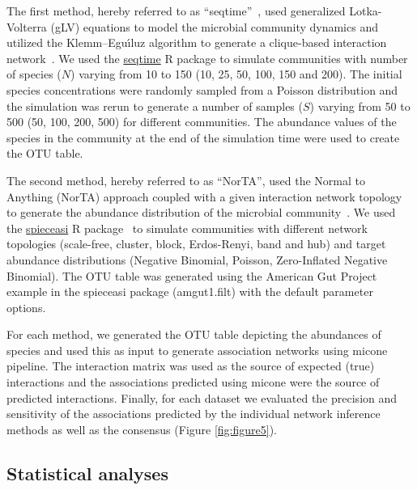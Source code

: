   The first method, hereby referred to as ``seqtime''~\cite{faustSignaturesEcologicalProcesses2018}, used generalized Lotka-Volterra (gLV) equations to model the microbial community dynamics and utilized the Klemm–Eguı́luz algorithm to generate a clique-based interaction network~\cite{Rottjers2018}.
  We used the \href{https://github.com/hallucigenia-sparsa/seqtime}{seqtime} R package to simulate communities with number of species ($N$) varying from 10 to 150 (10, 25, 50, 100, 150 and 200).
  The initial species concentrations were randomly sampled from a Poisson distribution and the simulation was rerun to generate a number of samples ($S$) varying from 50 to 500 (50, 100, 200, 500) for different communities.
  The abundance values of the species in the community at the end of the simulation time were used to create the OTU table.

  The second method, hereby referred to as ``NorTA'', used the Normal to Anything (NorTA) approach coupled with a given interaction network topology to generate the abundance distribution of the microbial community~\cite{Kurtz2015}.
  We used the \href{https://github.com/zdk123/SpiecEasi}{spieceasi} R package~\cite{Kurtz2015} to simulate communities with different network topologies (scale-free, cluster, block, Erdos-Renyi, band and hub) and target abundance distributions (Negative Binomial, Poisson, Zero-Inflated Negative Binomial).
  The OTU table was generated using the American Gut Project example in the spieceasi package (amgut1.filt) with the default parameter options.

  For each method, we generated the OTU table depicting the abundances of species and used this as input to generate association networks using \ac{micone} pipeline.
  The interaction matrix was used as the source of expected (true) interactions and the associations predicted using \ac{micone} were the source of predicted interactions.
  Finally, for each dataset we evaluated the precision and sensitivity of the associations predicted by the individual network inference methods as well as the consensus (Figure \ref{fig:figure5}).

  \subsection*{Statistical analyses}


